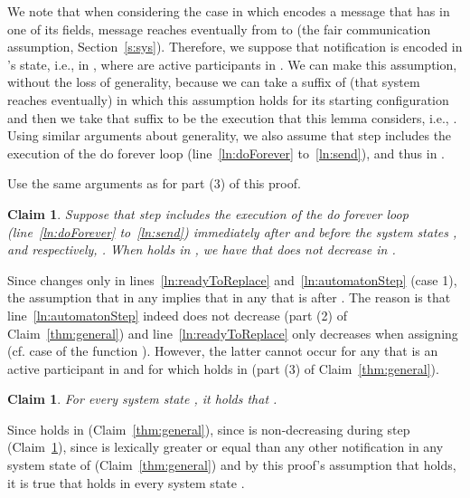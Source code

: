 \documentclass[11pt]{article}
\newtheorem{claim}[theorem]{Claim}
\newenvironment{proof}{\noindent{\bf Proof.}}{\hfill}
\begin{document}
\begin{proof}
\begin{proof}
We note that when considering the case in which  encodes a message  that has  in one of its fields, message  reaches eventually from  to  (the fair communication assumption, Section~\ref{s:sys}). Therefore, we suppose that notification  is encoded in 's state, i.e.,  in , where  are active participants in . We can make this assumption, without the loss of generality, because we can take a suffix of  (that system reaches eventually) in which this assumption holds for its starting configuration and then we take that suffix to be the execution that this lemma considers, i.e., .
Using similar arguments about generality, we also assume that step  includes the execution of the do forever loop (line~\ref{ln:doForever} to~\ref{ln:send}), and thus  in . 

Use the same arguments as for part (3) of this proof.
\end{proof}


\begin{claim}
\label{thm:notDec}
Suppose that step  includes the execution of the do forever loop (line~\ref{ln:doForever} to~\ref{ln:send}) immediately after and before the system states , and respectively, .  When  holds in , we have that  does not decrease in . 
\end{claim}
\begin{proof}
Since  changes only in lines~\ref{ln:readyToReplace} and~\ref{ln:automatonStep} (case 1), the assumption that  in any  implies that  in any  that is after . The reason is that line~\ref{ln:automatonStep} indeed does not decrease  (part (2) of Claim~\ref{thm:general}) and line~\ref{ln:readyToReplace} only decreases  when assigning  (cf. case  of the function ). However, the latter cannot occur for any  that is an active participant in  and for which  holds in  (part (3) of Claim~\ref{thm:general}).~\end{proof}

\begin{claim}
\label{thm:alwaysN}
For every system state , it holds that .
\end{claim}
\begin{proof}
Since  holds in  (Claim~\ref{thm:general}), since  is non-decreasing during step  (Claim~\ref{thm:notDec}), since  is lexically greater or equal than any other notification in any system state of  (Claim~\ref{thm:general}) and by this proof's assumption that  holds, it is true that  holds in every system state .
\end{proof}



\end{proof}
\end{document}

